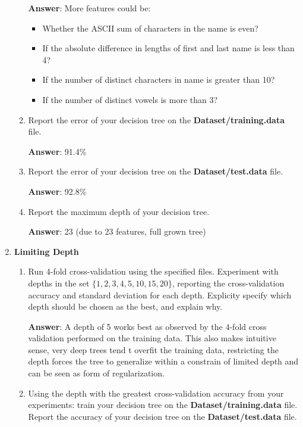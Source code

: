 \documentclass{article}
\begin{document}
\begin{enumerate}
\begin{enumerate}
        \textbf{Answer}: More features could be:
        \begin{itemize}
            \item Whether the ASCII sum of characters in the name is even?
            \item If the absolute difference in lengths of first and last name is less than 4? 
            \item If the number of distinct characters in name is greater than 10?
            \item If the number of distinct vowels is more than 3?
        \end{itemize}
        \item Report the error of your decision tree on the \textbf{Dataset/training.data} file.
        
        \textbf{Answer}: 91.4\%
        
        \item Report the error of your decision tree on the \textbf{Dataset/test.data} file.
        
        \textbf{Answer}: 92.8\%
        
        \item Report the maximum depth of your decision tree.
        
        \textbf{Answer}: 23 (due to 23 features, full grown tree)
    \end{enumerate}
    \item \textbf{Limiting Depth}
        \begin{enumerate}
            \item Run 4-fold cross-validation using the specified files.
            Experiment with depths in the set $\{1,2,3,4,5,10,15,20\}$, reporting the cross-validation accuracy and standard deviation for each depth. Explicity specify which depth should be chosen as the best, and explain why.
            
            \textbf{Answer}: A depth of 5 works best as observed by the 4-fold cross validation performed on the training data. This also makes intuitive sense, very deep trees tend t overfit the training data, restricting the depth forces the tree to generalize within a constrain of limited depth and can be seen as form of regularization.
            \item Using the depth with the greatest cross-validation accuracy from your experiments: train your decision tree on the \textbf{Dataset/training.data} file. Report the accuracy of your decision tree on the \textbf{Dataset/test.data} file.
            

\end{enumerate}
\end{enumerate}
\end{document}
